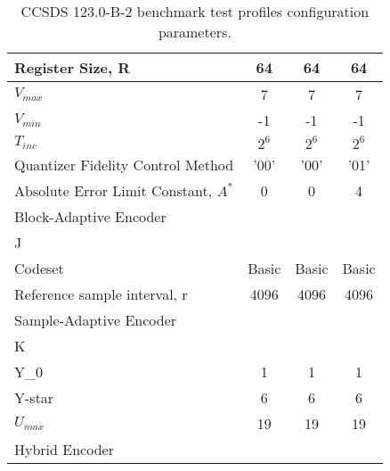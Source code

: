 \begin{table}[!h]
\begin{tabular}{|l|c|c|c|}
        Register Size, R                        & 64            & 64                & 64            \\ \hline
        $V_{max}$                               & 7             & 7                 & 7             \\ \hline
        $V_{min}$				                & -1            & -1                & -1            \\ \hline
        $T_{inc}$                               & $2^6$         & $2^6$             & $2^6$         \\ \hline
        \hline
        Quantizer Fidelity Control Method       & '00'          & '00'              & '01'          \\ \hline
        Absolute Error Limit Constant, $A^*$    & 0             & 0                 & 4             \\ \hline
        \hline
	    Block-Adaptive Encoder \\
	    \hline
        J			                            &               &                   &               \\ \hline	
	    Codeset	                                & Basic	        & Basic             & Basic         \\ \hline
	    Reference sample interval, r            & 4096          & 4096              & 4096          \\ \hline
	    \hline
        Sample-Adaptive Encoder \\ \hline
        \hline
        K                                       &               &                   &               \\ \hline
        Y_0					                    & 1             & 1                 & 1             \\ \hline
        Y-star				                    & 6             & 6                 & 6             \\ \hline
        $U_{max}$                               & 19            & 19                & 19            \\ \hline
        \hline
        Hybrid Encoder \\ \hline
        \hline
    \end{tabular}
    \caption{CCSDS 123.0-B-2 benchmark test profiles configuration parameters.}
    \label{tab:ccsds123_params}
\end{table}



					
					
